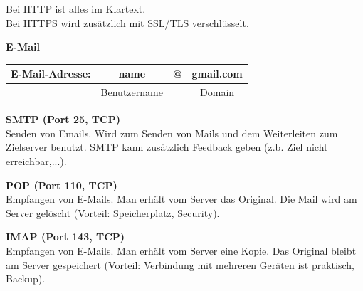 Bei HTTP ist alles im Klartext. \\
Bei HTTPS wird zusätzlich mit SSL/TLS verschlüsselt.

\textbf{E-Mail} \\
\begin{table}[H]
	\begin{tabular}{c|c|c|c}
		E-Mail-Adresse: & name & @ & gmail.com \\
		\hline
		& Benutzername & & Domain
	\end{tabular}
\end{table}

\textbf{SMTP (Port 25, TCP)} \\
Senden von Emails. Wird zum Senden von Mails und dem Weiterleiten zum Zielserver benutzt. SMTP kann zusätzlich Feedback geben (z.b. Ziel nicht erreichbar,...).

\textbf{POP (Port 110, TCP)} \\
Empfangen von E-Mails. Man erhält vom Server das Original. Die Mail wird am Server gelöscht (Vorteil: Speicherplatz, Security).

\textbf{IMAP (Port 143, TCP)} \\
Empfangen von E-Mails. Man erhält vom Server eine Kopie. Das Original bleibt am Server gespeichert (Vorteil: Verbindung mit mehreren Geräten ist praktisch, Backup).




